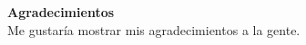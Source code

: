 \begin{center}
	\bigskip
	\bigskip
	\textbf{\huge {Agradecimientos}}\\
	\bigskip
	Me gustaría mostrar mis agradecimientos a la gente.
\end{center}